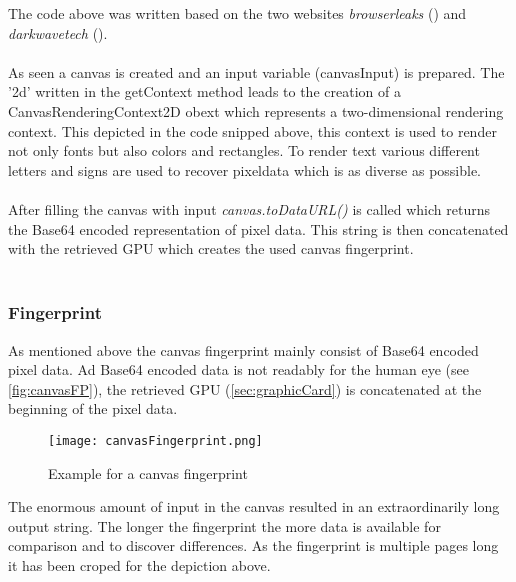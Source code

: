 The code above was written based on the two websites \textit{browserleaks} (\textcite{browserleaks}) and \textit{darkwavetech} (\textcite{jkula17}).\\\\
As seen a canvas is created and an input variable (canvasInput) is prepared. The '2d' written in the getContext method leads to the creation of a CanvasRenderingContext2D obext which represents a two-dimensional rendering context. This depicted in the code snipped above, this context is used to render not only fonts but also colors and rectangles. To render text various different letters and signs are used to recover pixeldata which is as diverse as possible.\\\\
After filling the canvas with input \textit{canvas.toDataURL()} is called which returns the Base64 encoded representation of pixel data. This string is then concatenated with the retrieved GPU which creates the used canvas fingerprint.\\\\

\subsubsection{Fingerprint}
As mentioned above the canvas fingerprint mainly consist of Base64 encoded pixel data. Ad Base64 encoded data is not readably for the human eye (see \autoref{fig:canvasFP}), the retrieved GPU (\autoref{sec:graphicCard}) is concatenated at the beginning of the pixel data. 
\begin{figure}[H]
	\centering
	\texttt{[image: canvasFingerprint.png]}
	\caption{Example for a canvas fingerprint\\}
	\label{fig:canvasFP}
\end{figure}
The enormous amount of input in the canvas resulted in an extraordinarily long output string. The longer the fingerprint the more data is available for comparison and to discover differences. As the fingerprint is multiple pages long it has been croped for the depiction above.

